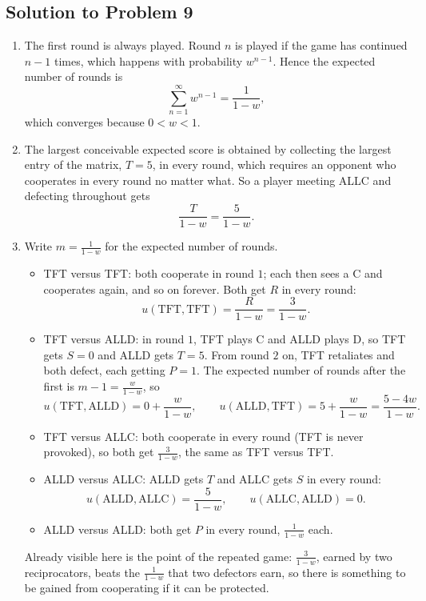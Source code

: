 \documentclass[a4paper,12pt]{article}
\begin{document}
\subsection*{Solution to Problem 9}

\begin{enumerate}[label=(\alph*)]
\item The first round is always played. Round $n$ is played if the game has continued $n-1$ times, which happens with probability $w^{n-1}$. Hence the expected number of rounds is
\[ \sum_{n=1}^{\infty} w^{n-1} = \frac{1}{1-w} , \]
which converges because $0<w<1$.

\item The largest conceivable expected score is obtained by collecting the largest entry of the matrix, $T=5$, in every round, which requires an opponent who cooperates in every round no matter what. So a player meeting ALLC and defecting throughout gets
\[ \frac{T}{1-w} = \frac{5}{1-w} . \]

\item Write $m = \frac{1}{1-w}$ for the expected number of rounds.
\begin{itemize}
\item TFT versus TFT: both cooperate in round $1$; each then sees a C and cooperates again, and so on forever. Both get $R$ in every round:
\[ u(\text{TFT},\text{TFT}) = \frac{R}{1-w} = \frac{3}{1-w} . \]
\item TFT versus ALLD: in round $1$, TFT plays C and ALLD plays D, so TFT gets $S=0$ and ALLD gets $T=5$. From round $2$ on, TFT retaliates and both defect, each getting $P=1$. The expected number of rounds after the first is $m-1=\frac{w}{1-w}$, so
\[ u(\text{TFT},\text{ALLD}) = 0 + \frac{w}{1-w}, \qquad
u(\text{ALLD},\text{TFT}) = 5 + \frac{w}{1-w} = \frac{5-4w}{1-w} . \]
\item TFT versus ALLC: both cooperate in every round (TFT is never provoked), so both get $\frac{3}{1-w}$, the same as TFT versus TFT.
\item ALLD versus ALLC: ALLD gets $T$ and ALLC gets $S$ in every round:
\[ u(\text{ALLD},\text{ALLC}) = \frac{5}{1-w}, \qquad u(\text{ALLC},\text{ALLD}) = 0 . \]
\item ALLD versus ALLD: both get $P$ in every round, $\frac{1}{1-w}$ each.
\end{itemize}
Already visible here is the point of the repeated game: $\frac{3}{1-w}$, earned by two reciprocators, beats the $\frac{1}{1-w}$ that two defectors earn, so there is something to be gained from cooperating if it can be protected.


\end{enumerate}
\end{document}

